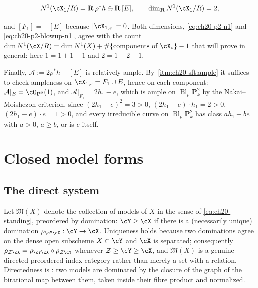 \begin{example}
\begin{equation}
\label{eq:ch20-p2-blowup-n1}
 N^1(\cX_1/R)=\mathbf R\,\rho^*h\oplus\mathbf R\,[E],
 \qquad \dim_{\mathbf R}N^1(\cX_1/R)=2,
\end{equation}

and \([F_1]=-[E]\) because \([\cX_{1,s}]=0\).  Both dimensions,
\eqref{eq:ch20-p2-n1} and \eqref{eq:ch20-p2-blowup-n1}, agree with the count
\(\dim N^1(\cX/R)=\dim N^1(X)+\#\{\text{components of }\cX_s\}-1\) that
 will prove in general: here
\(1=1+1-1\) and \(2=1+2-1\).

Finally, \(\mathcal A:=2\rho^*h-[E]\) is relatively ample.  By
\,\cref{itm:ch20-sft:ample} it suffices to
check ampleness on \(\cX_{1,s}=F_1\cup E\), hence on each component:
\(\mathcal A|_E=\cO_{\mathbf P^2}(1)\), and
\(\mathcal A|_{F_1}=2h_1-e\), which is ample on
\(\operatorname{Bl}_p\mathbf P^2_k\) by the Nakai--Moishezon criterion, since
\((2h_1-e)^2=3>0\), \((2h_1-e)\cdot h_1=2>0\), \((2h_1-e)\cdot e=1>0\), and
every irreducible curve on \(\operatorname{Bl}_p\mathbf P^2_k\) has class
\(ah_1-be\) with \(a>0\), \(a\ge b\), or is \(e\) itself.
\end{example}

\section{Closed model forms}
\label{sec:ch20-model-forms}

\subsection{The direct system}
\label{sec:ch20-direct-system}

Let \(\mathfrak M(X)\) denote the collection of models of \(X\) in the sense
of \eqref{eq:ch20-standing}, preordered by domination: \(\cY\geq\cX\) if
there is a (necessarily unique) domination \(\rho_{\cY\cX}:\cY\to\cX\).
Uniqueness holds because two dominations agree on the dense open subscheme
\(X\subset\cY\) and \(\cX\) is separated; consequently
\(\rho_{\mathcal Z\cX}=\rho_{\cY\cX}\circ\rho_{\mathcal Z\cY}\) whenever
\(\mathcal Z\geq\cY\geq\cX\), and \(\mathfrak M(X)\) is a genuine directed
preordered index category rather than merely a set with a relation.
Directedness is : two models are dominated by
the closure of the graph of the birational map between them, taken inside
their fibre product and normalized.

